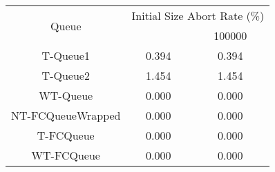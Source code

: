 \begin{tabular}{|c|c|c|}
\hline
\multirow{2}{*}{Queue} & \multicolumn{2}{c|}{Initial Size Abort Rate (\%)}\\\cline{2-3}& \qquad 10000 \qquad\quad & 100000\\
\hline
\hline
T-Queue1 & 0.394 & 0.394\\
T-Queue2 & 1.454 & 1.454\\
WT-Queue & 0.000 & 0.000\\
NT-FCQueueWrapped & 0.000 & 0.000\\
T-FCQueue & 0.000 & 0.000\\
WT-FCQueue & 0.000 & 0.000\\
\hline\end{tabular}
